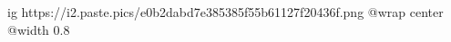  
 
 
 
 

\ifcmt
  ig https://i2.paste.pics/e0b2dabd7e385385f55b61127f20436f.png
  @wrap center
  @width 0.8
\fi
